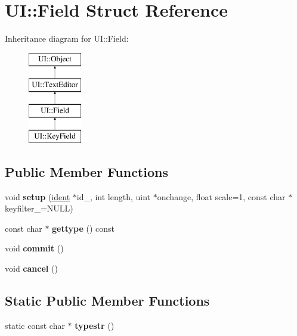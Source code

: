 \hypertarget{struct_u_i_1_1_field}{}\section{UI\+:\+:Field Struct Reference}
\label{struct_u_i_1_1_field}
Inheritance diagram for UI\+:\+:Field\+:\begin{figure}[H]
\begin{center}
\leavevmode
\includegraphics[height=4.000000cm]{struct_u_i_1_1_field}
\end{center}
\end{figure}
\subsection*{Public Member Functions}
\begin{DoxyCompactItemize}
\item 
\mbox{\label{struct_u_i_1_1_field_ab43dc0e4ad5f9764af01c27467db87c0}} 
void {\bfseries setup} (\hyperlink{structident}{ident} $\ast$id\+\_\+, int length, uint $\ast$onchange, float scale=1, const char $\ast$keyfilter\+\_\+=N\+U\+LL)
\item 
\mbox{\label{struct_u_i_1_1_field_a590b3f0cdfa1d4040dde2b9c65777e37}} 
const char $\ast$ {\bfseries gettype} () const
\item 
\mbox{\label{struct_u_i_1_1_field_a34b63e1013d2050c92dc8a5049325cb6}} 
void {\bfseries commit} ()
\item 
\mbox{\label{struct_u_i_1_1_field_a47c63127b38f926f8079ca021e226077}} 
void {\bfseries cancel} ()
\end{DoxyCompactItemize}
\subsection*{Static Public Member Functions}
\begin{DoxyCompactItemize}
\item 
\mbox{\label{struct_u_i_1_1_field_a74b316511cafe0855e8daeaae6cfbfda}} 
static const char $\ast$ {\bfseries typestr} ()
\end{DoxyCompactItemize}
